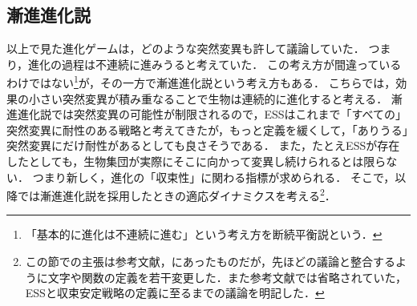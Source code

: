 \subsection{漸進進化説}
以上で見た進化ゲームは，どのような突然変異も許して議論していた．
つまり，進化の過程は不連続に進みうると考えていた．
この考え方が間違っているわけではない\footnote{「基本的に進化は不連続に進む」という考え方を断続平衡説という．}が，その一方で漸進進化説という考え方もある．
こちらでは，効果の小さい突然変異が積み重なることで生物は連続的に進化すると考える．
漸進進化説では突然変異の可能性が制限されるので，ESSはこれまで「すべての」突然変異に耐性のある戦略と考えてきたが，もっと定義を緩くして，「ありうる」突然変異にだけ耐性があるとしても良さそうである．
また，たとえESSが存在したとしても，生物集団が実際にそこに向かって変異し続けられるとは限らない．
つまり新しく，進化の「収束性」に関わる指標が求められる．
そこで，以降では漸進進化説を採用したときの適応ダイナミクスを考える\footnote{この節での主張は参考文献\cite{text}，\cite{jsmb}にあったものだが，先ほどの議論と整合するように文字や関数の定義を若干変更した．また参考文献\cite{text}では省略されていた，ESSと収束安定戦略の定義に至るまでの議論を明記した．}．

